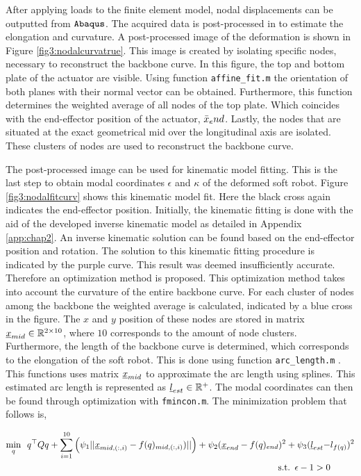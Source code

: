 After applying loads to the finite element model, nodal displacements can be outputted from $\verb+Abaqus+$. The acquired data is post-processed in \MATLAB to estimate the elongation and curvature. A post-processed image of the deformation is shown in Figure \ref{fig3:nodalcurvatrue}. This image is created by isolating specific nodes, necessary to reconstruct the backbone curve. In this figure, the top and bottom plate of the actuator are visible. Using \MATLAB function \verb+affine_fit.m+ \cite{affinefit} the orientation of both planes with their normal vector can be obtained. Furthermore, this function determines the weighted average of all nodes of the top plate. Which coincides with the end-effector position of the actuator, $\Bar{x}_end$. Lastly, the nodes that are situated at the exact geometrical mid over the longitudinal axis are isolated. These clusters of nodes are used to reconstruct the backbone curve. 


The post-processed image can be used for kinematic model fitting. This is the last step to obtain modal coordinates $\epsilon$ and $\kappa$ of the deformed soft robot. Figure \ref{fig3:nodalfitcurv} shows this kinematic model fit. Here the black cross again indicates the end-effector position. Initially, the kinematic fitting is done with the aid of the developed inverse kinematic model as detailed in Appendix \ref{app:chap2}. An inverse kinematic solution can be found based on the end-effector position and rotation. The solution to this kinematic fitting procedure is indicated by the purple curve. This result was deemed insufficiently accurate. Therefore an optimization method is proposed. This optimization method takes into account the curvature of the entire backbone curve. For each cluster of nodes among the backbone the weighted average is calculated, indicated by a blue cross in the figure. The $x$ and $y$ position of these nodes are stored in matrix $\underbar{$x$}_{mid} \in \mathbb{R}^{2\times 10}$, where $10$ corresponds to the amount of node clusters. Furthermore, the length of the backbone curve is determined, which corresponds to the elongation of the soft robot. This is done using \MATLAB function \verb+arc_length.m+ \cite{arclength}. This functions uses matrix $\underbar{$x$}_{mid}$ to approximate the arc length using splines. This estimated arc length is represented as $\underbar{$l$}_{est} \in \mathbb{R}^+$. The modal coordinates can then be found through optimization with \verb+fmincon.m+. The minimization problem that follows is,


\begin{equation}
\begin{aligned}
\min_{q} \hspace{5pt}  q^\top Q q  + \sum_{i=1}^{10}\Big(\psi_1 ||\text{\underbar{$x$}}_{mid,(:,i)} - f(q)_{mid,(:,i)})|| \Big) +   \psi_2(\text{\underbar{$x$}}_{end}  - f(q)_{end})^2 +  \psi_3(\text{\underbar{$l$}}_{est} - & l_{f(q)})^2  \\ 
\text{s.t.} \hspace{5pt} \epsilon - 1 > 0
\end{aligned}
\label{eq3:optim}
\end{equation}


